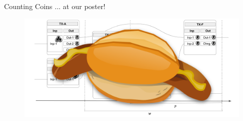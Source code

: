 \documentclass{beamer}
\begin{document}

\begin{frame}{Counting Coins ... at our poster!}
    \begin{figure}
      \centerline{\includegraphics[scale=0.23]{./pics/used/burgered_mcirc_concept_window_uneqal_period.png}}
    \end{figure}
\end{frame}





\end{document}
